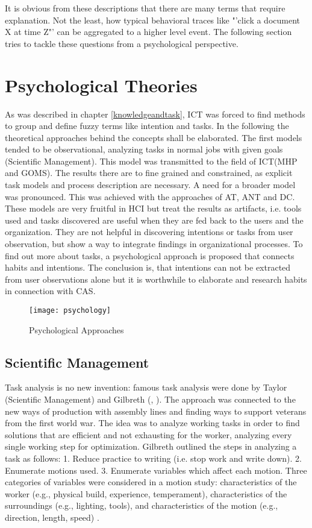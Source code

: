 It is obvious from these descriptions that there are many terms that require explanation. Not the least, how typical behavioral traces like "'click a document X at time Z"' can be aggregated to a higher level event. The following section tries to tackle these questions from a psychological perspective. 

\section{Psychological Theories}
As was described in chapter \ref{knowledgeandtask}, \acs{ICT} was forced to find methods to group and define fuzzy terms like intention and tasks. In the following the theoretical approaches behind the concepts shall be elaborated. The first models tended to be observational, analyzing tasks in normal jobs with given goals (Scientific Management). This model was transmitted to the field of \acs{ICT}(MHP and GOMS). The results there are to fine grained and constrained, as explicit task models and process description are necessary. A need for a broader model was pronounced. This was achieved with the approaches of \ac{AT}, \ac{ANT} and \ac{DC}. These models are very fruitful in \ac{HCI} but treat the results as artifacts, i.e. tools used and tasks discovered are useful when they are fed back to the users and the organization. They are not helpful in discovering intentions or tasks from user observation, but show a way to integrate findings in organizational processes. To find out more about tasks,  a psychological approach is proposed that connects habits and intentions. The conclusion is, that intentions can not be extracted from user observations alone but it is worthwhile to elaborate and research habits in connection with \ac{CAS}.

\begin{figure}[ht]
	\centering
  \texttt{[image: psychology]}
	\caption{Psychological Approaches}
	\label{fig2}
\end{figure}


\subsection{Scientific Management}
Task analysis is no new invention: famous task analysis were done by Taylor (Scientific Management) and Gilbreth (\cite{taylor2013scientific}, \cite{gilbreth1911motion}). The approach was connected to the new ways of production with assembly lines and finding ways to support veterans from the first world war. The idea was to analyze working tasks in order to find solutions that are efficient and not exhausting for the worker, analyzing every single working step for optimization. Gilbreth outlined the steps in analyzing a task as follows: 1. Reduce practice to writing (i.e. stop work and write down). 2. Enumerate motions used. 3. Enumerate variables which affect each motion. Three categories of variables were considered in a motion study: characteristics of the worker (e.g., physical build, experience, temperament), characteristics of the surroundings (e.g., lighting, tools), and characteristics of the motion (e.g., direction, length, speed) \cite{creighton1992origin}.

